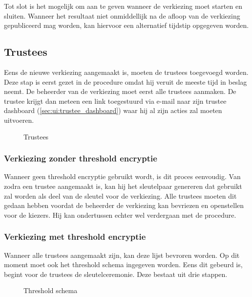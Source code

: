 \npar Tot slot is het mogelijk om aan te geven wanneer de verkiezing moet starten en sluiten. Wanneer het resultaat niet onmiddellijk na de afloop van de verkiezing gepubliceerd mag worden, kan hiervoor een alternatief tijdstip opgegeven worden.

\subsection{Trustees}
\label{sec:proc:trustees}

Eens de nieuwe verkiezing aangemaakt is, moeten de trustees toegevoegd worden. Deze stap is eerst gezet in de procedure omdat hij veruit de meeste tijd in beslag neemt. De beheerder van de verkiezing moet eerst alle trustees aanmaken. De trustee krijgt dan meteen een link toegestuurd via e-mail naar zijn trustee dashboard (\ref{sec:ui:trustee_dashboard}) waar hij al zijn acties zal moeten uitvoeren.

\begin{figure}
  \caption{Trustees}
  \label{fig:proc:trustees_view}
\end{figure}

\subsubsection{Verkiezing zonder threshold encryptie}

Wanneer geen threshold encryptie gebruikt wordt, is dit proces eenvoudig. Van zodra een trustee aangemaakt is, kan hij het sleutelpaar genereren dat gebruikt zal worden als deel van de sleutel voor de verkiezing. Alle trustees moeten dit gedaan hebben voordat de beheerder de verkiezing kan bevriezen en openstellen voor de kiezers. Hij kan ondertussen echter wel verdergaan met de procedure.

\subsubsection{Verkiezing met threshold encryptie}

\npar Wanneer alle trustees aangemaakt zijn, kan deze lijst bevroren worden. Op dit moment moet ook het threshold schema ingegeven worden. Eens dit gebeurd is, begint voor de trustees de sleutelceremonie. Deze bestaat uit drie stappen.

\begin{figure}
  \caption{Threshold schema}
  \label{fig:proc:trustees_freeze}
\end{figure}


